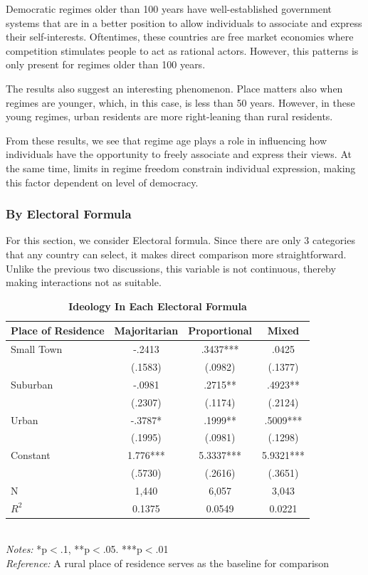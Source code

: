 \documentclass[12pt, titlepage]{article}
\newcommand\e{\emph}
\newcommand\tb{\textbf}
\begin{document}
Democratic regimes older than 100 years have well-established government systems that are in a better position to allow individuals to associate and express their self-interests. Oftentimes, these countries are free market economies where competition stimulates people to act as rational actors. However, this patterns is only present for regimes older than 100 years. 

The results also suggest an interesting phenomenon. Place matters also when regimes are younger, which, in this case, is less than 50 years. However, in these young regimes, urban residents are more right-leaning than rural residents. 

From these results, we see that regime age plays a role in influencing how individuals have the opportunity to freely associate and express their views. At the same time, limits in regime freedom constrain individual expression, making this factor dependent on level of democracy. 

\subsubsection{By Electoral Formula}

For this section, we consider Electoral formula. Since there are only 3 categories that any country can select, it makes direct comparison more straightforward. Unlike the previous two discussions, this variable is not continuous, thereby making interactions not as suitable.

\begin{table}[h!]
	\centering
	\caption{\tb{Ideology In Each Electoral Formula}}
	\begin{tabulary}{\linewidth}{l c c c}
		\\
		\hline
		\tb{Place of Residence}&\tb{Majoritarian}&\tb{Proportional} &\tb{Mixed} \\
		\hline
		Small Town&-.2413 &.3437*** &.0425 \\
		&(.1583)&(.0982) &(.1377) \\
		Suburban&-.0981 &.2715**&.4923**  \\ 
		&(.2307) &(.1174) &(.2124) \\
		Urban&-.3787* &.1999** &.5009*** \\
		&(.1995) &(.0981) &(.1298) \\
		Constant& 1.776*** &5.3337***&5.9321*** \\
		&(.5730) &(.2616) &(.3651) \\
		N&1,440&6,057 &3,043\\
		$R^2$&0.1375&0.0549&0.0221 \\
		\hline 
	\end{tabulary} 
\\ 
\e{Notes:} *p$<$.1, **p$<$.05. ***p$<$.01 \\
\e{Reference:} A rural place of residence serves as the baseline for comparison
\label{table16}
\end{table}
\end{document}
